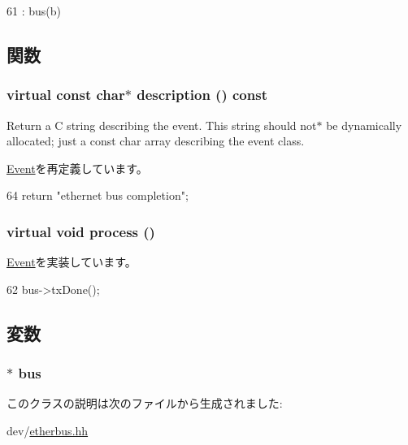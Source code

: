 \begin{DoxyCode}
61 : bus(b) {}
\end{DoxyCode}


\subsection{関数}
\hypertarget{classEtherBus_1_1DoneEvent_a130ddddf003422b413e2e891b1b80e8f}{
\subsubsection[{description}]{\setlength{\rightskip}{0pt plus 5cm}virtual const char$\ast$ description () const}}
\label{classEtherBus_1_1DoneEvent_a130ddddf003422b413e2e891b1b80e8f}
Return a C string describing the event. This string should not$\ast$ be dynamically allocated; just a const char array describing the event class. 

\hyperlink{classEvent_a130ddddf003422b413e2e891b1b80e8f}{Event}を再定義しています。


\begin{DoxyCode}
64             { return "ethernet bus completion"; }
\end{DoxyCode}
\hypertarget{classEtherBus_1_1DoneEvent_a6780fc1879338e1ff38faf7279ec6a0b}{
\subsubsection[{process}]{\setlength{\rightskip}{0pt plus 5cm}virtual void process ()}}
\label{classEtherBus_1_1DoneEvent_a6780fc1879338e1ff38faf7279ec6a0b}


\hyperlink{classEvent_a142b75b68a6291400e20fb0dd905b1c8}{Event}を実装しています。


\begin{DoxyCode}
62 { bus->txDone(); }
\end{DoxyCode}


\subsection{変数}
\hypertarget{classEtherBus_1_1DoneEvent_abd467a939ce7cff4543502c412d5b1d6}{
\subsubsection[{bus}]{$\ast$ {\bf bus}}}
\label{classEtherBus_1_1DoneEvent_abd467a939ce7cff4543502c412d5b1d6}


このクラスの説明は次のファイルから生成されました:\begin{DoxyCompactItemize}
\item 
dev/\hyperlink{etherbus_8hh}{etherbus.hh}\end{DoxyCompactItemize}
